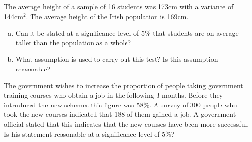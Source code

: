 

\item The average height of a sample of 16 students was 173cm with a variance of 144cm$^2$. 
The average height of the Irish population is 169cm. 
\begin{enumerate}[(a)]
\item Can it be stated at a significance level of 5\% that students are on average taller than the population as a whole? 
 \item What assumption is used to carry out this test? Is this assumption reasonable?
\end{enumerate}





\item The government wishes to increase the proportion of people taking government training courses who obtain a job in the following 3 months. Before they introduced the new schemes this figure was 58\%. A survey of 300 people who took the new courses indicated that 188 of them gained a job. A government official stated that this indicates that the new courses have been more successful. 
Is his statement reasonable at a significance level of 5\%?

